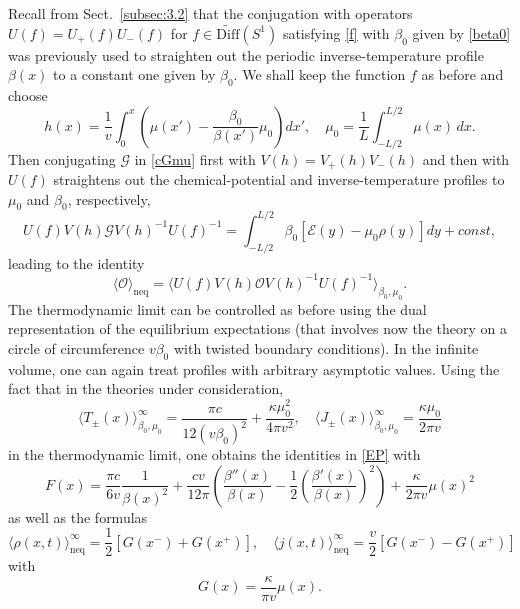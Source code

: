 \documentclass[12pt,a4paper]{article}
\newcommand{\SL}{S^1}
\newcommand{\wDiff}{\widetilde{\mathrm{Diff}}}
\newcommand{\cE}{\mathcal{E}}
\newcommand{\cG}{\mathcal{G}}
\newcommand{\cO}{\mathcal{O}}
\theoremstyle{definition}
\theoremstyle{remark}
\begin{document}
Recall from Sect.~\ref{subsec:3.2} that the conjugation with operators $U(f)= U_{+}(f)U_{-}(f)$ for $f\in\wDiff(\SL)$ satisfying \eqref{f} with $\beta_0$ given by \eqref{beta0} was previously used to straighten out the periodic inverse-temperature profile $\beta(x)$ to a constant one given by $\beta_0$.
We shall keep the function $f$ as before and choose
%
\begin{equation}
h(x) = \frac{1}{v} \int_0^x \left( \mu(x') - \frac{\beta_0}{\beta(x')}\mu_0 \right) dx',
\quad
\mu_0 = \frac{1}{L} \int_{-L/2}^{L/2} \mu(x) \, dx.
\end{equation}
%
Then conjugating $\cG$ in \eqref{cGmu} first with $V(h)= V_+(h)V_-(h)$ and then with $U(f)$ straightens out the chemical-potential and inverse-temperature profiles to $\mu_0$ and $\beta_0$, respectively,
%
\begin{equation}
U(f)V(h)\cG V(h)^{-1}U(f)^{-1}
= \int_{-L/2}^{L/2}\beta_0 \left[ \cE(y) - \mu_0\rho(y) \right] dy + const,
\end{equation}
%
leading to the identity
%
\begin{equation}
\big\langle\cO\big\rangle_{\text{neq}}
= \big\langle U(f)V(h)\cO V(h)^{-1} U(f)^{-1}\big\rangle_{\beta_0,\mu_0}.
\end{equation}
%
The thermodynamic limit can be controlled as before using the dual representation of the equilibrium expectations (that involves now the theory on a circle of circumference $v\beta_0$ with twisted boundary conditions).
In the infinite volume, one can again treat profiles with arbitrary asymptotic values.
Using the fact that in the theories under consideration,
%
\begin{equation}
\big\langle T_{\pm}(x)\big\rangle^\infty_{\beta_0,\mu_0}
= \frac{\pi c}{12(v\beta_0)^2}+\frac{\kappa\mu_0^2}{4\pi v^2},
\quad
\big\langle J_{\pm}(x)\big\rangle^\infty_{\beta_0,\mu_0}
= \frac{\kappa\mu_0}{2\pi v}
\end{equation}
%
in the thermodynamic limit, one obtains the identities in \eqref{EP} with
%
\begin{equation}
\label{Fmu}  
F(x)
= \frac{\pi c}{6v} \frac{1}{\beta(x)^2}
	+ \frac{cv}{12\pi} \left(
			\frac{\beta''(x)}{\beta(x)}
			- \frac{1}{2} \left( \frac{\beta'(x)}{\beta(x)} \right)^2
		\right)
	+ \frac{\kappa}{2\pi v}\mu(x)^2
\end{equation}
%
as well as the formulas
%
\begin{equation}
\bigl\langle \rho(x,t) \bigr\rangle^\infty_{\text{neq}}
= \frac{1}{2} \left[ G(x^-) + G(x^+) \right],
\quad
\bigl\langle j(x,t) \bigr\rangle^\infty_{\text{neq}}
= \frac{v}{2} \left[ G(x^-) - G(x^+) \right]
\end{equation}
%
with
%
\begin{equation}
\label{Kmu}  
G(x) = \frac{\kappa}{\pi v} \mu(x).  
\end{equation}
%
\end{document}
